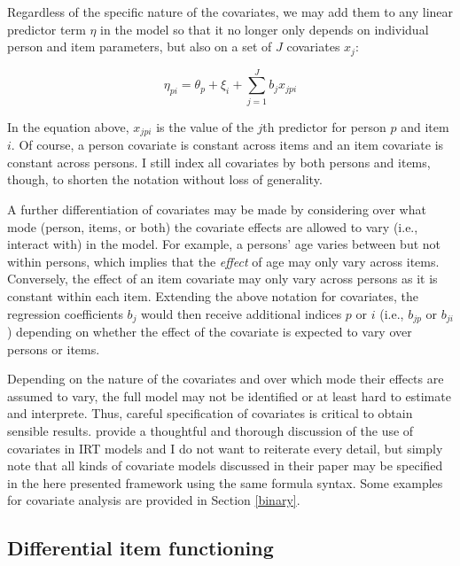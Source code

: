 \documentclass[
]{jss}
\begin{document}
Regardless of the specific nature of the covariates, we may add them to
any linear predictor term \(\eta\) in the model so that it no longer
only depends on individual person and item parameters, but also on a set
of \(J\) covariates \(x_j\):

\[
\eta_{pi} = \theta_p + \xi_i + \sum_{j=1}^J b_j x_{jpi}
\]

In the equation above, \(x_{jpi}\) is the value of the \(j\)th predictor
for person \(p\) and item \(i\). Of course, a person covariate is
constant across items and an item covariate is constant across persons.
I still index all covariates by both persons and items, though, to
shorten the notation without loss of generality.

A further differentiation of covariates may be made by considering over
what mode (person, items, or both) the covariate effects are allowed to
vary (i.e., interact with) in the model. For example, a persons' age
varies between but not within persons, which implies that the
\emph{effect} of age may only vary across items. Conversely, the effect
of an item covariate may only vary across persons as it is constant
within each item. Extending the above notation for covariates, the
regression coefficients \(b_j\) would then receive additional indices
\(p\) or \(i\) (i.e., \(b_{jp}\) or \(b_{ji}\)) depending on whether the
effect of the covariate is expected to vary over persons or items.

Depending on the nature of the covariates and over which mode their
effects are assumed to vary, the full model may not be identified or at
least hard to estimate and interprete. Thus, careful specification of
covariates is critical to obtain sensible results. \citet{deboeck2011}
provide a thoughtful and thorough discussion of the use of covariates in
IRT models and I do not want to reiterate every detail, but simply note
that all kinds of covariate models discussed in their paper may be
specified in the here presented framework using the same formula syntax.
Some examples for covariate analysis are provided in Section
\ref{binary}.

\hypertarget{differential-item-functioning}{%
\subsection{Differential item
functioning}\label{differential-item-functioning}}
\end{document}
